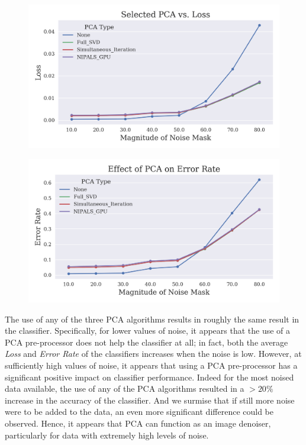 \documentclass[12pt]{article}
\begin{document}
\begin{figure}[H]
\centering
\begin{minipage}{.45\textwidth}
  \centering
  \includegraphics[width=\linewidth]{NIPALS_Loss.png}
  \label{PCA_Loss}
\end{minipage}%
\quad
\begin{minipage}{.45\textwidth}
  \centering
  \includegraphics[width=\linewidth]{NIPALS_Error_Rate.png}
  \label{PCA_Error_Rate}
\end{minipage}
\end{figure}

The use of any of the three PCA algorithms results in roughly the same result in the classifier. Specifically, for lower values of noise, it appears that the use of a PCA pre-processor does not help the classifier at all; in fact, both the average \textit{Loss} and \textit{Error Rate} of the classifiers increases when the noise is low. However, at sufficiently high values of noise, it appears that using a PCA pre-processor has a significant positive impact on classifier performance. Indeed for the most noised data available, the use of any of the PCA algorithms resulted in a $>20\%$ increase in the accuracy of the classifier. And we surmise that if still more noise were to be added to the data, an even more significant difference could be observed. Hence, it appears that PCA can function as an image denoiser, particularly for data with extremely high levels of noise.
\end{document}
